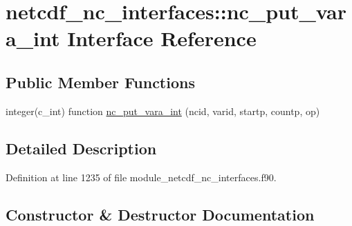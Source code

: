 \hypertarget{interfacenetcdf__nc__interfaces_1_1nc__put__vara__int}{}\section{netcdf\+\_\+nc\+\_\+interfaces\+:\+:nc\+\_\+put\+\_\+vara\+\_\+int Interface Reference}
\label{interfacenetcdf__nc__interfaces_1_1nc__put__vara__int}
\subsection*{Public Member Functions}
\begin{DoxyCompactItemize}
\item 
integer(c\+\_\+int) function \hyperlink{interfacenetcdf__nc__interfaces_1_1nc__put__vara__int_a19e99ec19574996293f432b3ce8e68ad}{nc\+\_\+put\+\_\+vara\+\_\+int} (ncid, varid, startp, countp, op)
\end{DoxyCompactItemize}


\subsection{Detailed Description}


Definition at line 1235 of file module\+\_\+netcdf\+\_\+nc\+\_\+interfaces.\+f90.



\subsection{Constructor \& Destructor Documentation}
\mbox{\label{interfacenetcdf__nc__interfaces_1_1nc__put__vara__int_a19e99ec19574996293f432b3ce8e68ad}} 
